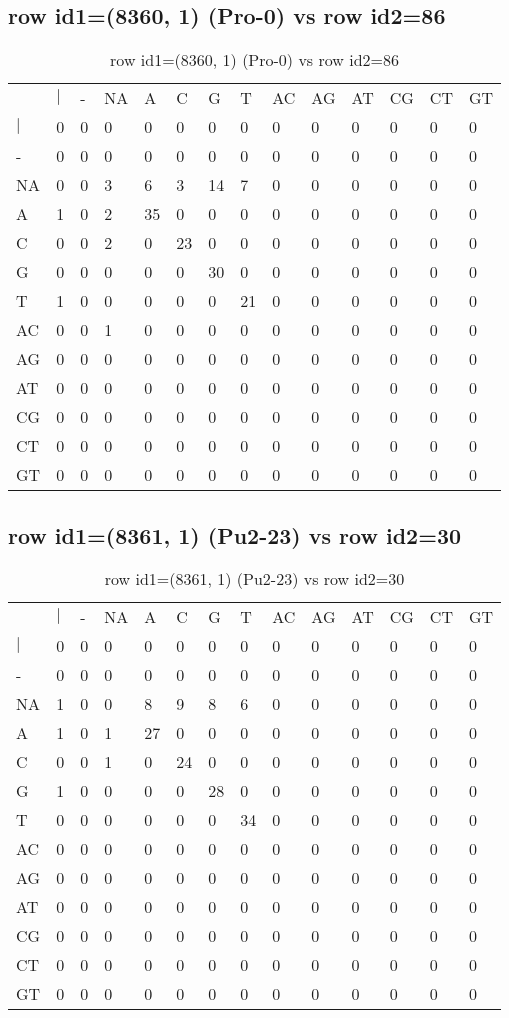\subsection{row id1=(8360, 1) (Pro-0) vs row id2=86}
\begin{center}
\begin{longtable}{|l|l|l|l|l|l|l|l|l|l|l|l|l|l|}
\caption{row id1=(8360, 1) (Pro-0) vs row id2=86} \label{table_dm392}\\
\hline
\\
\hline
&$|$&-&NA&A&C&G&T&AC&AG&AT&CG&CT&GT\\
$|$&0&0&0&0&0&0&0&0&0&0&0&0&0\\
-&0&0&0&0&0&0&0&0&0&0&0&0&0\\
NA&0&0&3&6&3&14&7&0&0&0&0&0&0\\
A&1&0&2&35&0&0&0&0&0&0&0&0&0\\
C&0&0&2&0&23&0&0&0&0&0&0&0&0\\
G&0&0&0&0&0&30&0&0&0&0&0&0&0\\
T&1&0&0&0&0&0&21&0&0&0&0&0&0\\
AC&0&0&1&0&0&0&0&0&0&0&0&0&0\\
AG&0&0&0&0&0&0&0&0&0&0&0&0&0\\
AT&0&0&0&0&0&0&0&0&0&0&0&0&0\\
CG&0&0&0&0&0&0&0&0&0&0&0&0&0\\
CT&0&0&0&0&0&0&0&0&0&0&0&0&0\\
GT&0&0&0&0&0&0&0&0&0&0&0&0&0\\
\hline
\end{longtable}
\end{center}

\subsection{row id1=(8361, 1) (Pu2-23) vs row id2=30}
\begin{center}
\begin{longtable}{|l|l|l|l|l|l|l|l|l|l|l|l|l|l|}
\caption{row id1=(8361, 1) (Pu2-23) vs row id2=30} \label{table_dm394}\\
\hline
\\
\hline
&$|$&-&NA&A&C&G&T&AC&AG&AT&CG&CT&GT\\
$|$&0&0&0&0&0&0&0&0&0&0&0&0&0\\
-&0&0&0&0&0&0&0&0&0&0&0&0&0\\
NA&1&0&0&8&9&8&6&0&0&0&0&0&0\\
A&1&0&1&27&0&0&0&0&0&0&0&0&0\\
C&0&0&1&0&24&0&0&0&0&0&0&0&0\\
G&1&0&0&0&0&28&0&0&0&0&0&0&0\\
T&0&0&0&0&0&0&34&0&0&0&0&0&0\\
AC&0&0&0&0&0&0&0&0&0&0&0&0&0\\
AG&0&0&0&0&0&0&0&0&0&0&0&0&0\\
AT&0&0&0&0&0&0&0&0&0&0&0&0&0\\
CG&0&0&0&0&0&0&0&0&0&0&0&0&0\\
CT&0&0&0&0&0&0&0&0&0&0&0&0&0\\
GT&0&0&0&0&0&0&0&0&0&0&0&0&0\\
\hline
\end{longtable}
\end{center}

